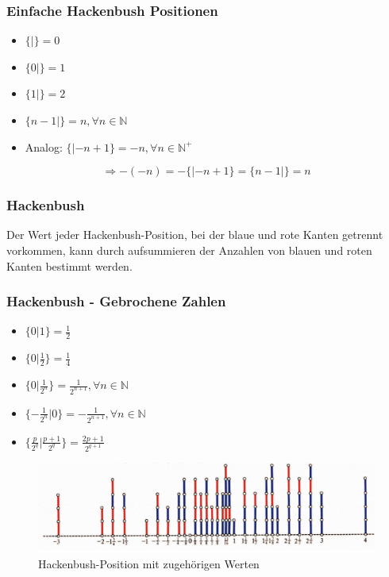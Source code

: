 \documentclass[12pt, aspectratio=169]{beamer}
\begin{document}
\begin{frame}
    \frametitle{Einfache Hackenbush Positionen}
    \begin{itemize}
        \item<1-> $\{|\} = 0$
        \item<2-> $\{0|\} = 1$
        \item<3-> $\{1|\} = 2$
        \item<4-> $\{n-1|\} = n, \forall n \in \mathbb{N}$
        \item<5-> Analog: $\{|-n+1\} = -n, \forall n \in \mathbb{N^+}$
    \end{itemize}
    \vspace*{20px}
     {
        \[\Rightarrow -(-n) = -\{|-n+1\} = \{n-1|\} = n\]
    }
\end{frame}

\begin{frame}
    \frametitle{Hackenbush}
    \huge{Der Wert jeder Hackenbush-Position, bei der blaue und rote Kanten getrennt vorkommen, 
    kann durch aufsummieren der Anzahlen von blauen und roten Kanten bestimmt werden.}
\end{frame}

\begin{frame}
    \frametitle{Hackenbush - Gebrochene Zahlen}
    \begin{itemize}
        \item<1-> $\{0|1\} = \frac{1}{2}$
        \item<2-> $\{0|\frac{1}{2}\} = \frac{1}{4}$
        \item<3-> $\{0|\frac{1}{2^n}\} = \frac{1}{2^{n+1}}, \forall n \in \mathbb{N}$
        \item<4-> $\{-\frac{1}{2^n}|0\} = -\frac{1}{2^{n+1}}, \forall n \in \mathbb{N}$
        \item<5-> $\{\frac{p}{2^{q}} | \frac{p+1}{2^{q}}\} = \frac{2p+1}{2^{q+1}}$
    \end{itemize}
\end{frame}

\begin{frame}
    \begin{figure}
        \includegraphics[width=\textwidth]{pic/hackenbush-nums.png}
        \caption{Hackenbush-Position mit zugehörigen Werten \tiny{\cite{ww}}}
    \end{figure}
\end{frame}
\end{document}
